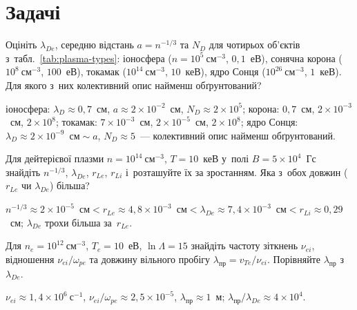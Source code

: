 \section*{Задачі}

\begin{problem}\label{prb:PlasmaTable}
Оцініть $\lambda_{De}$, середню відстань
$a=n^{-1/3}$ та $N_D$ для чотирьох об'єктів з~табл.~\ref{tab:plasma-types}:
іоносфера ($n=10^5~\mathrm{см}^{-3}$, $0{,}1$~еВ), сонячна корона
($10^8~\mathrm{см}^{-3}$, $100$~еВ), токамак
($10^{14}~\mathrm{см}^{-3}$, $10$~кеВ), ядро Сонця
($10^{26}~\mathrm{см}^{-3}$, $1$~кеВ). Для якого з~них колективний
опис найменш обґрунтований?
	\begin{solution}
		іоносфера: $\lambda_D\approx0{,}7$~см, $a\approx2\times10^{-2}$~см, $N_D\approx2\times10^{5}$;
корона: $0{,}7$~см, $2\times10^{-3}$~см, $2\times10^{8}$; токамак: $7\times10^{-3}$~см, $2\times10^{-5}$~см, $2\times10^{8}$;
ядро Сонця: $\lambda_D\approx2\times10^{-9}$~см${}\sim a$, $N_D\approx5$~--- колективний опис найменш обґрунтований.
	\end{solution}
\end{problem}

\begin{problem}\label{prb:PlasmaScales}
Для дейтерієвої плазми $n=10^{14}~\mathrm{см}^{-3}$,
$T=10$~кеВ у~полі $B=5\times10^{4}$~Гс знайдіть
$n^{-1/3}$, $\lambda_{De}$, $r_{Le}$, $r_{Li}$ і~розташуйте їх за
зростанням. Яка з~обох довжин ($r_{Le}$ чи $\lambda_{De}$) більша?
	\begin{solution}
		$n^{-1/3}\approx2\times10^{-5}$~см${}<r_{Le}\approx4{,}8\times10^{-3}$~см${}<\lambda_{De}\approx7{,}4\times10^{-3}$~см${}<r_{Li}\approx0{,}29$~см;
$\lambda_{De}$ трохи більша за~$r_{Le}$.
	\end{solution}
\end{problem}

\begin{problem}\label{prb:PlasmaCollisions}
Для $n_e=10^{12}~\mathrm{см}^{-3}$, $T_e=10$~еВ,
$\ln\Lambda=15$ знайдіть частоту зіткнень $\nu_{ei}$, відношення
$\nu_{ei}/\omega_{pe}$ та довжину вільного пробігу
$\lambda_{\mathrm{пр}}=v_{Te}/\nu_{ei}$. Порівняйте
$\lambda_{\mathrm{пр}}$ з~$\lambda_{De}$.
	\begin{solution}
		$\nu_{ei}\approx1{,}4\times10^{6}~\mathrm{с}^{-1}$, $\nu_{ei}/\omega_{pe}\approx2{,}5\times10^{-5}$,
$\lambda_{\mathrm{пр}}\approx1$~м; $\lambda_{\mathrm{пр}}/\lambda_{De}\approx4\times10^{4}$.
	\end{solution}
\end{problem}

